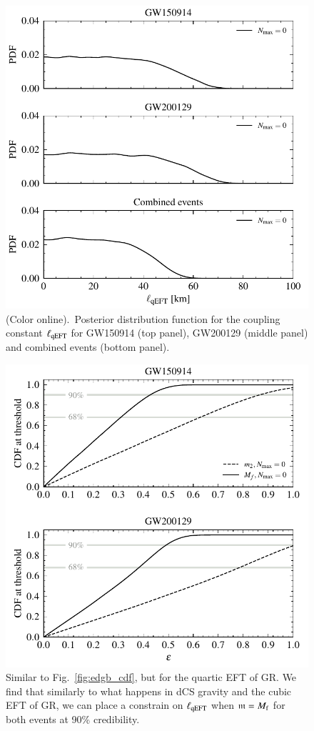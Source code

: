 \documentclass[twocolumn,
               prd,
               aps,
               superscriptaddress,
               tightenlines,
               nofootinbib,
               eqsecnum,
               amsfonts,
               amsmath,
               longbibliography]{revtex4-1}
\newcommand{\gm}{\mathfrak{m}}
\begin{document}
\begin{figure}[t]
\includegraphics[width=\columnwidth]{figs/qeft_posteriors_combined.pdf}
\caption{(Color online).~Posterior distribution function for the coupling constant $\ell_{\rm qEFT}$ for
GW150914 (top panel), GW200129 (middle panel) and combined events (bottom panel).
}
\label{fig:qEFT_exec_sum}
\end{figure}

\begin{figure}[t]
\includegraphics[width=\columnwidth]{figs/qeft_cdf_varying_threshold.pdf}
\caption{Similar to Fig.~\ref{fig:edgb_cdf}, but for the quartic EFT of GR.
We find that similarly to what happens in dCS gravity and the cubic EFT of GR, we
can place a constrain on $\ell_{\rm qEFT}$ when $\gm = M_{\rm f}$ for both events at 90\% credibility.
}
\label{fig:qEFT_cdf}
\end{figure}
\end{document}
